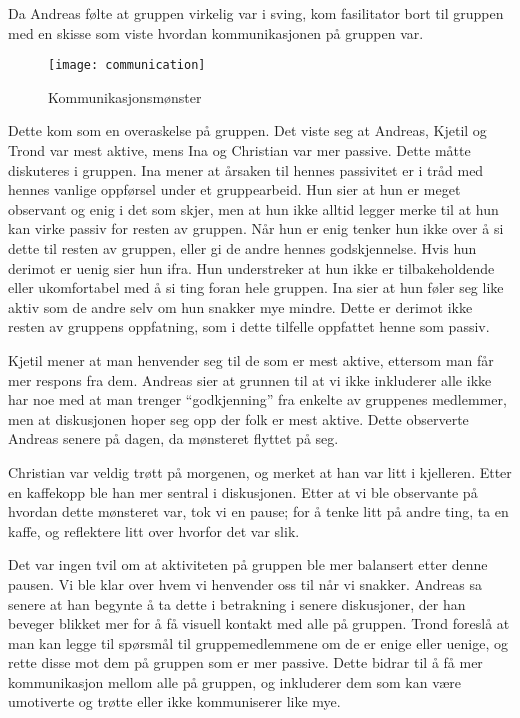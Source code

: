 Da Andreas følte at gruppen virkelig var i sving, kom fasilitator bort
til gruppen med en skisse som viste hvordan kommunikasjonen på gruppen
var.
\begin{figure}
\begin{center}
\texttt{[image: communication]}
\caption{Kommunikasjonsmønster}
\end{center}
\end{figure}
Dette kom som en overaskelse på gruppen. Det viste seg at Andreas,
Kjetil og Trond var mest aktive, mens Ina og Christian var mer passive.
Dette måtte diskuteres i gruppen.  Ina mener at årsaken til hennes
passivitet er i tråd med hennes vanlige oppførsel under et gruppearbeid.
Hun sier at hun er meget observant og enig i det som skjer, men at hun
ikke alltid legger merke til at hun kan virke passiv for resten av
gruppen. Når hun er enig tenker hun ikke over å si dette til resten av
gruppen, eller gi de andre hennes godskjennelse. Hvis hun derimot er
uenig sier hun ifra. Hun understreker at hun ikke er tilbakeholdende
eller ukomfortabel med å si ting foran hele gruppen. Ina sier at hun
føler seg like aktiv som de andre selv om hun snakker mye mindre. Dette
er derimot ikke resten av gruppens oppfatning, som i dette tilfelle
oppfattet henne som passiv. 

Kjetil mener at man henvender seg til de som er mest aktive, ettersom
man får mer respons fra dem. Andreas sier at grunnen til at vi ikke
inkluderer alle ikke har noe med at man trenger “godkjenning” fra
enkelte av gruppenes medlemmer, men at diskusjonen hoper seg opp der
folk er mest aktive. Dette observerte Andreas senere på dagen, da
mønsteret flyttet på seg. 

Christian var veldig trøtt på morgenen, og merket at han var litt i
kjelleren. Etter en kaffekopp ble han mer sentral i diskusjonen. Etter
at vi ble observante på hvordan dette mønsteret var, tok vi en pause;
for å tenke litt på andre ting, ta en kaffe, og reflektere litt over
hvorfor det var slik. 

Det var ingen tvil om at aktiviteten på gruppen ble mer balansert etter
denne pausen. Vi ble klar over hvem vi henvender oss til når vi snakker.
Andreas sa senere at han begynte å ta dette i betrakning i senere
diskusjoner, der han beveger blikket mer for å få visuell kontakt med
alle på gruppen. Trond foreslå at man kan legge til spørsmål til
gruppemedlemmene om de er enige eller uenige, og rette disse mot dem på
gruppen som er mer passive. Dette bidrar til å få mer kommunikasjon
mellom alle på gruppen, og inkluderer dem som kan være umotiverte og
trøtte eller ikke kommuniserer like mye. 

